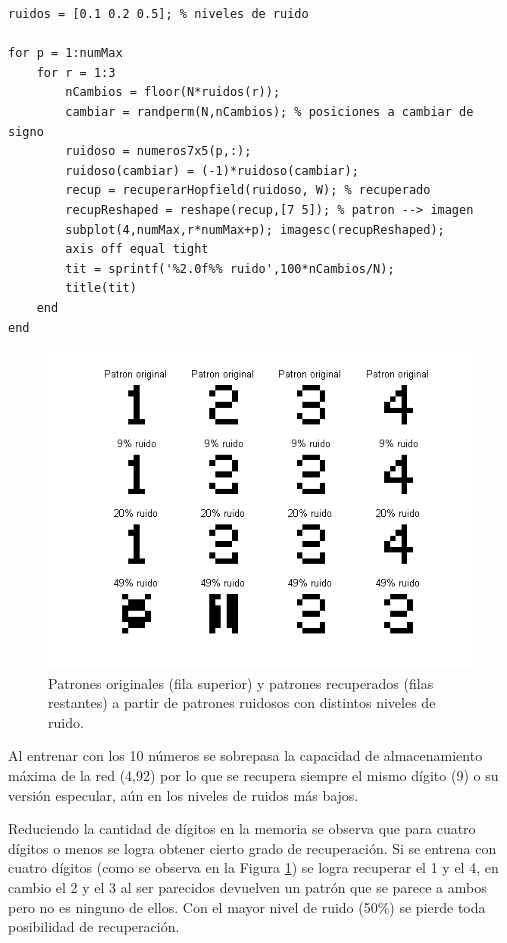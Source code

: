 \documentclass[11pt,a4paper,final]{article}
\begin{document}
\begin{verbatim}
ruidos = [0.1 0.2 0.5]; % niveles de ruido

for p = 1:numMax
    for r = 1:3
        nCambios = floor(N*ruidos(r));
        cambiar = randperm(N,nCambios); % posiciones a cambiar de signo
        ruidoso = numeros7x5(p,:);
        ruidoso(cambiar) = (-1)*ruidoso(cambiar);
        recup = recuperarHopfield(ruidoso, W); % recuperado
        recupReshaped = reshape(recup,[7 5]); % patron --> imagen
        subplot(4,numMax,r*numMax+p); imagesc(recupReshaped);
        axis off equal tight
        tit = sprintf('%2.0f%% ruido',100*nCambios/N);
        title(tit)
    end
end
\end{verbatim}

\begin{figure}
\includegraphics [width=\textwidth]{Ejercicio6_04.png}
\caption{Patrones originales (fila superior) y patrones recuperados (filas restantes) a partir de patrones ruidosos con distintos niveles de ruido.}
\label{fig:ejercicio64}
\end{figure}

Al entrenar con los 10 números se sobrepasa la capacidad de almacenamiento máxima de la red (4,92) por lo que se recupera siempre el mismo dígito (9) o su versión especular, aún en los niveles de ruidos más bajos.

Reduciendo la cantidad de dígitos en la memoria se observa que para cuatro dígitos o menos se logra obtener cierto grado de recuperación. Si se entrena con cuatro dígitos (como se observa en la Figura \ref{fig:ejercicio64}) se logra recuperar el 1 y el 4, en cambio el 2 y el 3 al ser parecidos devuelven un patrón que se parece a ambos pero no es ninguno de ellos. Con el mayor nivel de ruido (50\%) se pierde toda posibilidad de recuperación.

\clearpage
\end{document}
